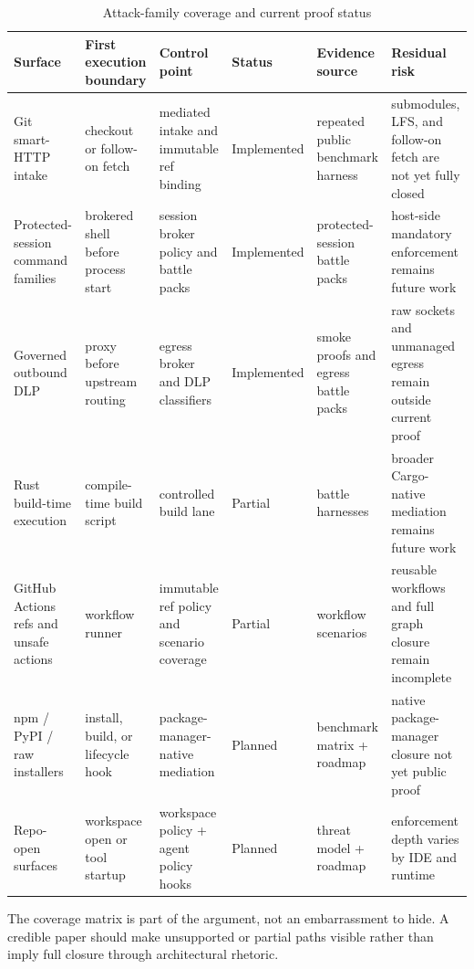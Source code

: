 \documentclass[conference]{IEEEtran}
\begin{document}
\begin{table}[t]
\caption{Attack-family coverage and current proof status}
\label{tab:coverage}
\centering
\scriptsize
\setlength{\tabcolsep}{3pt}
\begin{tabular}{@{}L{0.13\textwidth}L{0.14\textwidth}L{0.16\textwidth}L{0.10\textwidth}L{0.18\textwidth}L{0.21\textwidth}@{}}
\toprule
\textbf{Surface} & \textbf{First execution boundary} & \textbf{Control point} & \textbf{Status} & \textbf{Evidence source} & \textbf{Residual risk} \\
\midrule
Git smart-HTTP intake & checkout or follow-on fetch & mediated intake and immutable ref binding & Implemented & repeated public benchmark harness \cite{zitpitBench2026} & submodules, LFS, and follow-on fetch are not yet fully closed \\
Protected-session command families & brokered shell before process start & session broker policy and battle packs & Implemented & protected-session battle packs \cite{zitpitBenchmarkMatrix2026} & host-side mandatory enforcement remains future work \\
Governed outbound DLP & proxy before upstream routing & egress broker and DLP classifiers & Implemented & smoke proofs and egress battle packs \cite{zitpitBenchmarkMatrix2026} & raw sockets and unmanaged egress remain outside current proof \\
Rust build-time execution & compile-time build script & controlled build lane & Partial & battle harnesses \cite{zitpitBenchmarkMatrix2026} & broader Cargo-native mediation remains future work \\
GitHub Actions refs and unsafe actions & workflow runner & immutable ref policy and scenario coverage & Partial & workflow scenarios \cite{zitpitBenchmarkMatrix2026} & reusable workflows and full graph closure remain incomplete \\
npm / PyPI / raw installers & install, build, or lifecycle hook & package-manager-native mediation & Planned & benchmark matrix + roadmap \cite{zitpitBenchmarkMatrix2026} & native package-manager closure not yet public proof \\
Repo-open surfaces & workspace open or tool startup & workspace policy + agent policy hooks & Planned & threat model + roadmap \cite{zitpitBenchmarkMatrix2026} & enforcement depth varies by IDE and runtime \\
\bottomrule
\end{tabular}
\end{table}

The coverage matrix is part of the argument, not an embarrassment to hide. A credible paper should make unsupported or partial paths visible rather than imply full closure through architectural rhetoric.
\end{document}
